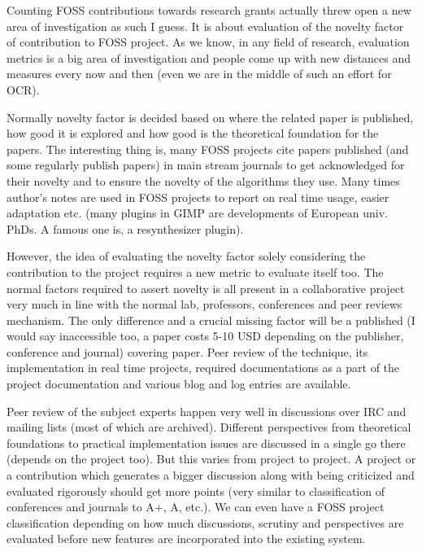 \vskip 2pt

Counting FOSS contributions towards research grants actually threw open
a new area of investigation as such I guess. It is about evaluation of the novelty
factor of contribution to FOSS project. As we know, in any field of research,
evaluation metrics is a big area of investigation and people come up with new
distances and measures every now and then (even we are in the middle of
such an effort for OCR). 

Normally novelty factor is decided based on where
the related paper is published, how good it is explored and how good is the
theoretical foundation for the papers. The interesting thing is, many FOSS
projects cite papers published (and some regularly publish papers) in main
stream journals to get acknowledged for their novelty and to ensure the novelty of
the algorithms they use. Many times author's notes are used in FOSS projects to
report on real time usage, easier adaptation etc. (many plugins in GIMP are
developments of European univ. PhDs. A famous one is, a resynthesizer plugin).

However, the idea of evaluating the novelty factor solely considering the contribution
to the project requires a new metric to evaluate itself too. The normal factors
required to assert novelty is all present in a collaborative project very
much in line with the normal lab, professors, conferences and peer reviews mechanism.
The only difference and a crucial missing factor will be a published (I would
say inaccessible too, a paper costs 5-10 USD depending on the publisher,
conference and journal) covering paper. Peer review of the technique,
its implementation in real time projects, required documentations as a
part of the project documentation and various blog and log entries are
available.

Peer review of the subject experts happen very well in discussions
over IRC and mailing lists (most of which are archived). Different perspectives
from theoretical foundations to practical implementation issues are discussed
in a single go there (depends on the project too). But this varies from project
to project. A project or a contribution which generates a bigger discussion
along with being criticized and evaluated rigorously should get more points (very similar
to classification of conferences and journals to A+, A, etc.).  We can even
have a FOSS project classification depending on how much discussions, scrutiny
and perspectives are evaluated before new features are incorporated into the
existing system.

